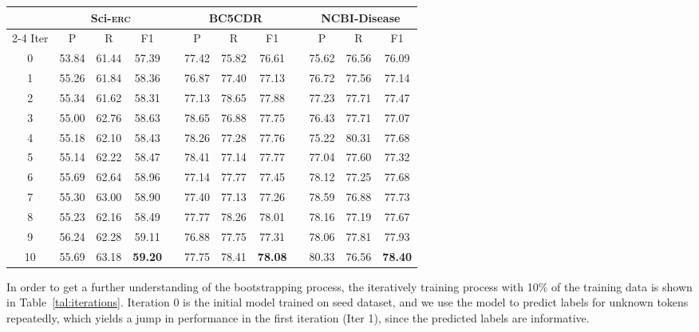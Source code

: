 \documentclass[10pt, conference, compsocconf]{IEEEtran}
\newcommand{\Scierc}{\textsc{S}ci-\textsc{erc}\xspace}
\begin{document}
\begin{table*}[t!]
    \caption{Performance of iterative bootstrapping process using 10\% training data. (P: Precision, R: Recall)}
    \label{tal:iterations}
    \centering
    \setlength{\tabcolsep}{9.5pt}
    \small{ 
    \begin{tabular}{@{}cccccccccccc@{}}
    \toprule
    & \multicolumn{3}{c}{\Scierc} && \multicolumn{3}{c}{BC5CDR} && \multicolumn{3}{c}{NCBI-Disease} \\
    \cmidrule{2-4} \cmidrule{6-8}  \cmidrule{10-12}  
      Iter & P & R & F1 && P & R & F1  && P & R & F1\\ 
      \midrule
     0 & 53.84 & 61.44 & 57.39 && 77.42 & 75.82 & 76.61 && 75.62 & 76.56 & 76.09 \\ 
     \hline
     1 & 55.26 & 61.84 & 58.36 && 76.87 & 77.40 & 77.13 && 76.72 & 77.56 & 77.14 \\ 
     2 & 55.34 & 61.62 & 58.31 && 77.13 & 78.65 & 77.88 && 77.23 & 77.71 & 77.47 \\ 
     3 & 55.00 & 62.76 & 58.63 && 78.65 & 76.88 & 77.75 && 76.43 & 77.71 & 77.07 \\ 
     4 & 55.18 & 62.10 & 58.43 && 78.26 & 77.28 & 77.76 && 75.22 & 80.31 & 77.68 \\ 
     5 & 55.14 & 62.22 & 58.47 && 78.41 & 77.14 & 77.77 && 77.04 & 77.60 & 77.32 \\ 
     6 & 55.69 & 62.64 & 58.96 && 77.14 & 77.77 & 77.45 && 78.12 & 77.25 & 77.68 \\ 
     7 & 55.30 & 63.00 & 58.90 && 77.40 & 77.13 & 77.26 && 78.59 & 76.88 & 77.73 \\ 
     8 & 55.23 & 62.16 & 58.49 && 77.77 & 78.26 & 78.01 && 78.16 & 77.19 & 77.67 \\ 
     9 & 56.24 & 62.28 & 59.11 && 76.88 & 77.75 & 77.31 && 78.06 & 77.81 & 77.93 \\ 
     10 & 55.69 & 63.18 & \textbf{59.20} && 77.75 & 78.41 & \textbf{78.08} && 80.33 & 76.56 & \textbf{78.40} \\
    \bottomrule
    \end{tabular}
    }
\end{table*}
In order to get a further understanding of the bootstrapping process,
the iteratively training process with 10\% of the training
data is shown in Table~\ref{tal:iterations}. 
Iteration 0 is the initial model trained on seed dataset, and we use the model to predict labels for unknown tokens repeatedly,
which yields a jump in performance in the first
iteration (Iter 1), since the predicted labels are informative.  
\end{document}
